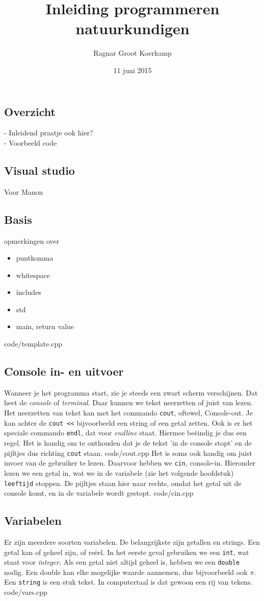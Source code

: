 \documentclass[12pt,a4paper]{article}
\title{Inleiding programmeren natuurkundigen}
\author{Ragnar Groot Koerkamp}
\date{11 juni 2015}
\newcommand{\code}{}
\newcommand{\icode}{\lstinline}
\begin{document}
 
\maketitle

\tableofcontents
\subsection{Overzicht}
- Inleidend praatje ook hier?\\
- Voorbeeld code\\
\subsection{Visual studio}
Voor Manon
\subsection{Basis}
opmerkingen over
\begin{itemize}
		\item 
			puntkomma
		\item
			whitespace
		\item includes
		\item std
		\item main, return value
\end{itemize}
\code{code/template.cpp}
\subsection{Console in- en uitvoer}
Wanneer je het programma start, zie je steeds een zwart scherm verschijnen. Dat heet de \emph{console} of \emph{terminal}. Daar kunnen we tekst neerzetten of juist van lezen. Het neerzetten van tekst kan met het commando \icode{cout}, oftewel, Console-out. Je kan achter de \icode{cout <<} bijvoorbeeld een string of een getal zetten. Ook is er het speciale commando \icode{endl}, dat voor \emph{endline} staat. Hiermee be\"eindig je dus een regel. Het is handig om te onthouden dat je de tekst 'in de console stopt' en de pijltjes dus richting \icode{cout} staan.
\code{code/cout.cpp}
Het is soms ook handig om juist invoer van de gebruiker te lezen. Daarvoor hebben we \icode{cin}, console-in. Hieronder lezen we een getal in, wat we in de variabele (zie het volgende hoofdstuk) \icode{leeftijd} stoppen. De pijltjes staan hier naar rechts, omdat het getal uit de console komt, en in de variabele wordt gestopt.
\code{code/cin.cpp}
\subsection{Variabelen}
Er zijn meerdere soorten variabelen. De belangrijkste zijn getallen en strings. Een getal kan of geheel zijn, of re\"eel. In het eerste geval gebruiken we een \icode{int}, wat staat voor \emph{integer}. Als een getal niet altijd geheel is, hebben we een \icode{double} nodig. Een double kan elke mogelijke waarde aannemen, dus bijvoorbeeld ook $\pi$.\\
Een \icode{string} is een stuk tekst. In computertaal is dat gewoon een rij van tekens.
\code{code/vars.cpp}
\end{document}
